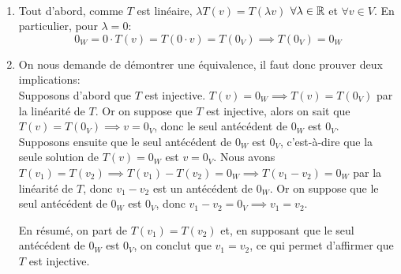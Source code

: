 \begin{exercice}
\,
\begin{enumerate}
    \item Tout d'abord, comme $T$ est linéaire, $\lambda T(v) = T(\lambda v)$ $\forall \lambda \in \mathbb{R}$ et $\forall v \in V$. En particulier, pour $\lambda = 0$:
    $$0_W = 0 \cdot T(v) = T(0 \cdot v) = T(0_V) \implies T(0_V) = 0_W$$
    
    \item On nous demande de démontrer une équivalence, il faut donc prouver deux implications: \\
    
    Supposons d'abord que $T$ est injective. $T(v)=0_W \implies T(v) = T(0_V)$ par la linéarité de $T$. Or on suppose que $T$ est injective, alors on sait que $T(v) = T(0_V) \implies v = 0_V$, donc le seul antécédent de $0_W$ est $0_V$. \\
    
    Supposons ensuite que le seul antécédent de $0_W$ est $0_V$, c'est-à-dire que la seule solution de $T(v)=0_W$ est $v=0_V$. Nous avons $T(v_1) = T(v_2) \implies T(v_1) - T(v_2) = 0_W \implies T(v_1 - v_2) = 0_W $ par la linéarité de $T$, donc $v_1-v_2$ est un antécédent de $0_W$. Or on suppose que le seul antécédent de $0_W$ est $0_V$, donc $v_1 - v_2 = 0_V \implies v_1 = v_2$. 
    
    En résumé, on part de $T(v_1) = T(v_2)$ et, en supposant que le seul antécédent de $0_W$ est $0_V$, on conclut que $v_1 = v_2$, ce qui permet d'affirmer que $T$ est injective. \\
\end{enumerate}
\end{exercice}